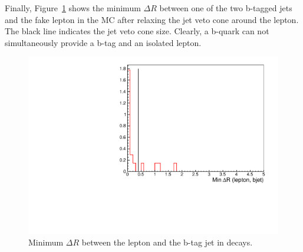 Finally, Figure~\ref{fig:ttbar_residual} shows the minimum $\Delta R$ between one of the two b-tagged jets and 
the fake lepton in the MC after 
relaxing the jet veto cone around the lepton. 
The black line indicates the jet veto cone size. Clearly, a b-quark can not simultaneously provide a b-tag and an isolated lepton.

\begin{figure}[htb]
\begin{center}
\includegraphics[width=0.6\linewidth, height=0.4\linewidth]{figs/bjetlepton.pdf}
\caption{ Minimum $\Delta R$ between the lepton and the b-tag jet in \ttbar decays.\label{fig:ttbar_residual}}
\end{center}
\end{figure}




 




